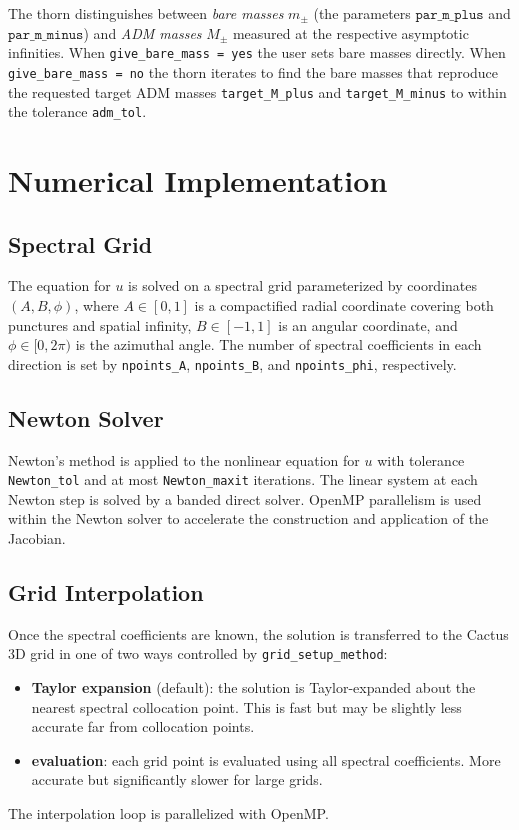 The thorn distinguishes between \emph{bare masses} $m_\pm$ (the parameters
$\texttt{par\_m\_plus}$ and $\texttt{par\_m\_minus}$) and \emph{ADM masses}
$M_\pm$ measured at the respective asymptotic infinities.  When
\texttt{give\_bare\_mass = yes} the user sets bare masses directly.  When
\texttt{give\_bare\_mass = no} the thorn iterates to find the bare masses
that reproduce the requested target ADM masses \texttt{target\_M\_plus} and
\texttt{target\_M\_minus} to within the tolerance \texttt{adm\_tol}.

\section{Numerical Implementation}

\subsection{Spectral Grid}

The equation for $u$ is solved on a spectral grid parameterized by
coordinates $(A, B, \phi)$, where $A \in [0,1]$ is a compactified radial
coordinate covering both punctures and spatial infinity, $B \in [-1,1]$ is an
angular coordinate, and $\phi \in [0, 2\pi)$ is the azimuthal angle.  The
number of spectral coefficients in each direction is set by \texttt{npoints\_A},
\texttt{npoints\_B}, and \texttt{npoints\_phi}, respectively.

\subsection{Newton Solver}

Newton's method is applied to the nonlinear equation for $u$ with tolerance
\texttt{Newton\_tol} and at most \texttt{Newton\_maxit} iterations.  The
linear system at each Newton step is solved by a banded direct solver.
OpenMP parallelism is used within the Newton solver to accelerate the
construction and application of the Jacobian.

\subsection{Grid Interpolation}

Once the spectral coefficients are known, the solution is transferred to the
Cactus 3D grid in one of two ways controlled by \texttt{grid\_setup\_method}:
\begin{itemize}
  \item \textbf{Taylor expansion} (default): the solution is Taylor-expanded
    about the nearest spectral collocation point.  This is fast but may be
    slightly less accurate far from collocation points.
  \item \textbf{evaluation}: each grid point is evaluated using all spectral
    coefficients.  More accurate but significantly slower for large grids.
\end{itemize}
The interpolation loop is parallelized with OpenMP.

